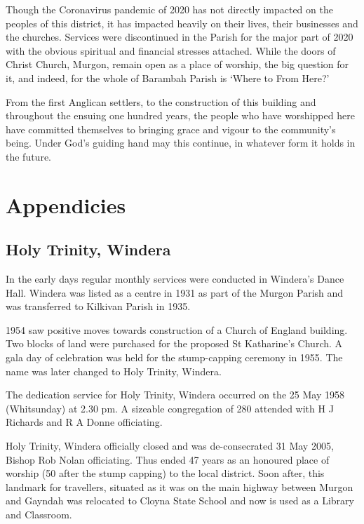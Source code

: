 Though the Coronavirus pandemic of 2020 has not directly impacted on the peoples of this district, it has impacted heavily on their lives, their businesses and the churches. Services were discontinued in the Parish for the major part of 2020 with the obvious spiritual and financial stresses attached. While the doors of Christ Church, Murgon, remain open as a place of worship, the big question for it, and indeed, for the whole of Barambah Parish is `Where to From Here?'



From the first Anglican settlers, to the construction of this building and throughout the ensuing one hundred years, the people who have worshipped here have committed themselves to bringing grace and vigour to the community's being. Under God's guiding hand may this continue, in whatever form it holds in the future.

\balance


\backmatter
\chapter{Appendicies}
\nobalance


\section{Holy Trinity, Windera}



In the early days regular monthly services were conducted in Windera's Dance Hall. Windera was listed as a centre in 1931 as part of the Murgon Parish and was transferred to Kilkivan Parish in 1935.



1954 saw positive moves towards construction of a Church of England building. Two blocks of land were purchased for the proposed St Katharine's Church. A gala day of celebration was held for the stump-capping ceremony in 1955. The name was later changed to Holy Trinity, Windera.



The dedication service for Holy Trinity, Windera occurred on the 25 May 1958 (Whitsunday) at 2.30 pm. A sizeable congregation of 280 attended with H J Richards and R A Donne officiating.



Holy Trinity, Windera officially closed and was de-consecrated 31 May 2005, Bishop Rob Nolan officiating. Thus ended 47 years as an honoured place of worship (50 after the stump capping) to the local district. Soon after, this landmark for travellers, situated as it was on the main highway between Murgon and Gayndah was relocated to Cloyna State School and now is used as a Library and Classroom.



